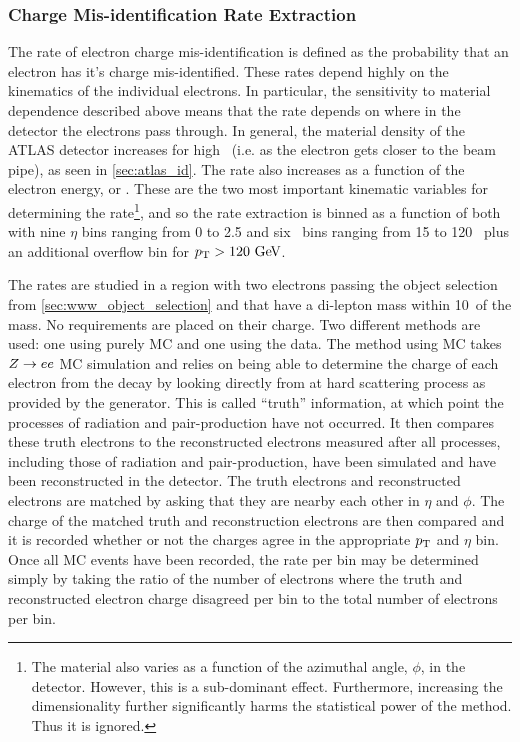 \subsubsection{Charge Mis-identification Rate Extraction}

The rate of electron charge mis-identification is defined as 
the probability that an electron has it's charge mis-identified.
These rates depend highly on the kinematics of the individual electrons.
In particular, the sensitivity to material dependence described above 
means that the rate depends on where in the detector the electrons
pass through. In general, the material density of the ATLAS
detector increases for high \eta~(i.e. as the electron gets closer to the
beam pipe), as seen in \sec\ref{sec:atlas_id}. The rate also increases as a function of the electron energy, 
or \pt. These are the two most important kinematic variables for determining
the rate\footnote{The material also varies as a function of the azimuthal angle,
$\phi$, in the detector. However, this is a sub-dominant effect. Furthermore,
increasing the dimensionality further significantly harms the statistical 
power of the method. Thus it is ignored.}, and 
so the rate extraction is binned as a function of both with nine $\eta$ 
bins ranging from 0 to 2.5 and six \pt~bins ranging from 15 to 120 \GeV~plus
an additional overflow bin for $\pt>120\GeV$.



The rates are studied in a region with two electrons passing the object
selection from \sec\ref{sec:www_object_selection} and that have
a di-lepton mass within 10~\GeV of the \z mass. No requirements are placed
on their charge. Two different methods
are used: one using purely MC and one using the data.
The method using MC takes $Z\rightarrow ee$ MC simulation 
and relies on being able to determine the charge of each electron from the 
\z decay by looking 
directly from at hard scattering process as provided by the generator.
This is called ``truth'' information, at which point the processes of radiation
and pair-production have not occurred. It then compares
these truth electrons to the reconstructed electrons 
measured after all processes, including those of radiation and pair-production,
have been simulated and have been reconstructed
in the detector. The truth electrons and reconstructed electrons
are matched by asking that they are nearby each other in $\eta$ and $\phi$.
The charge of the matched truth and reconstruction electrons 
are then compared and it is recorded whether or not the charges agree
in the appropriate $p_{\mathrm{T}}$ and $\eta$ bin. Once all MC events
have been recorded, the rate per bin may be determined simply 
by taking the ratio of the number of electrons where the truth and reconstructed
electron charge disagreed per bin to the total number of electrons per bin. 

